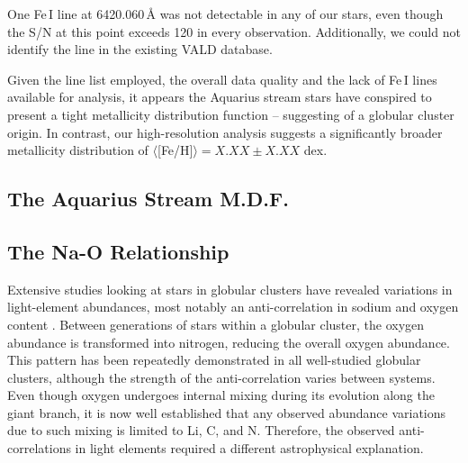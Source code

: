 \documentclass{emulateapj}
\begin{document}
One Fe\,I line at 6420.060\,\AA{} was not detectable in any of our stars, even though the S/N at this point exceeds 120 in every observation. Additionally, we could not identify the line in the existing VALD database.



Given the line list employed, the overall data quality and the lack of Fe\,I lines available for analysis, it appears the Aquarius stream stars have conspired to present a tight metallicity distribution function -- suggesting of a globular cluster origin. In contrast, our high-resolution analysis suggests a significantly broader metallicity distribution of $\langle$[Fe/H]$\rangle = X.XX \pm X.XX$ dex.

\subsection{The Aquarius Stream M.D.F.}

\subsection{The Na-O Relationship}


Extensive studies looking at stars in globular clusters have revealed variations in light-element abundances, most notably an anti-correlation in sodium and oxygen content \citet{Norris;Da-Costa_1995}. Between generations of stars within a globular cluster, the oxygen abundance is transformed into nitrogen, reducing the overall oxygen abundance. 
This pattern has been repeatedly demonstrated in all well-studied globular clusters, although the strength of the anti-correlation varies between systems. Even though oxygen undergoes internal mixing during its evolution along the giant branch, it is now well established that any observed abundance variations due to such mixing is limited to Li, C, and N. Therefore, the observed anti-correlations in light elements required a different astrophysical explanation.

\end{document}
